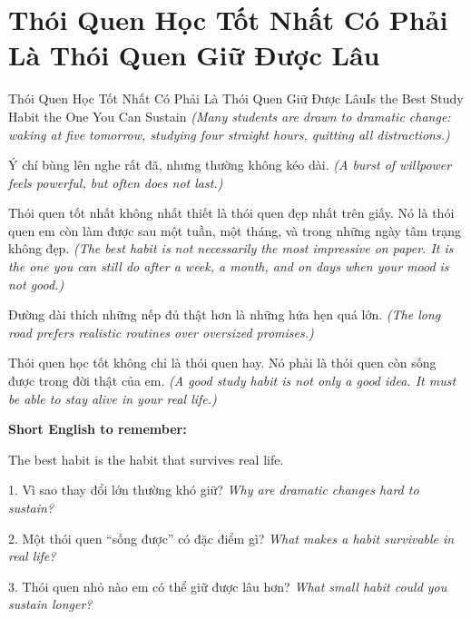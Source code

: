 \section{Thói Quen Học Tốt Nhất Có Phải Là Thói Quen Giữ Được Lâu}
\begin{truyen}{Thói Quen Học Tốt Nhất Có Phải Là Thói Quen Giữ Được Lâu}{Is the Best Study Habit the One You Can Sustain}
\textit{(Many students are drawn to dramatic change: waking at five tomorrow, studying four straight hours, quitting all distractions.)}

Ý chí bùng lên nghe rất đã, nhưng thường không kéo dài.
\textit{(A burst of willpower feels powerful, but often does not last.)}

Thói quen tốt nhất không nhất thiết là thói quen đẹp nhất trên giấy. Nó là thói quen em còn làm được sau một tuần, một tháng, và trong những ngày tâm trạng không đẹp.
\textit{(The best habit is not necessarily the most impressive on paper. It is the one you can still do after a week, a month, and on days when your mood is not good.)}

Đường dài thích những nếp đủ thật hơn là những hứa hẹn quá lớn.
\textit{(The long road prefers realistic routines over oversized promises.)}
\end{truyen}

\begin{baihoc}
Thói quen học tốt không chỉ là thói quen hay. Nó phải là thói quen còn sống được trong đời thật của em.
\textit{(A good study habit is not only a good idea. It must be able to stay alive in your real life.)}
\end{baihoc}

\begin{ghinhoanh}
\textbf{Short English to remember:}

The best habit is the habit that survives real life.

\end{ghinhoanh}

\begin{tuhocnhanh}
1. Vì sao thay đổi lớn thường khó giữ? \textit{Why are dramatic changes hard to sustain?}

2. Một thói quen “sống được” có đặc điểm gì? \textit{What makes a habit survivable in real life?}

3. Thói quen nhỏ nào em có thể giữ được lâu hơn? \textit{What small habit could you sustain longer?}
\end{tuhocnhanh}
\ngancach

